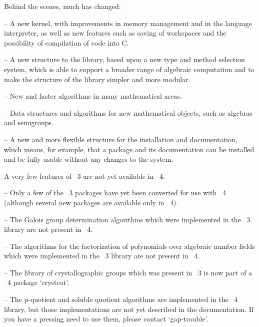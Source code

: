 Behind the scenes, much has changed: 

\beginlist%
  \item{--} A new kernel,  with improvements in  memory management  and in
  the language interpreter, as well  as new  features  such as saving  of
  workspaces and the possibility of compilation of {\GAP} code into C.

  \item{--} A new structure   to the library, based  upon  a new  type and
  method  selection system, which  is able to  support a broader range of
  algebraic computation and to make the  structure of the library simpler
  and more modular.

  \item{--}
    New and faster algorithms in many mathematical areas.

  \item{--} 
    Data structures and algorithms for new mathematical objects, such as
    algebras and semigroups.

  \item{--}
    A new and more flexible structure  for the {\GAP} installation
    and documentation, which  means, for example, that a {\GAP} package and
    its documentation can be installed and be fully usable without any changes
    to the {\GAP} system.
\endlist

A very few features of {\GAP}~3 are not yet available in  {\GAP}~4.

\beginlist%
   \item{--}
     Only a few of the {\GAP}~3 packages have yet been converted
     for use with  {\GAP}~4 (although several new packages are available
     only in  {\GAP}~4). 

   \item{--} The Galois group determination algorithms which were
      implemented in the {\GAP}~3 library are not present in {\GAP}~4.
    
   \item{--} The algorithms for the factorization of polynomials over
   algebraic number fields which were implemented in the {\GAP}~3 library
   are not present in {\GAP}~4.

   \item{--} The library of crystallographic groups which was present in
     {\GAP}~3 is now part of a {\GAP}~4 package `crystcat'.

   \item{--} The p-quotient and soluble quotient algorithms are
   implemented in the {\GAP}~4 library, but those implementations are not
   yet described in the documentation. If you have a pressing need to use
   them, please contact `gap-trouble'.
\endlist


